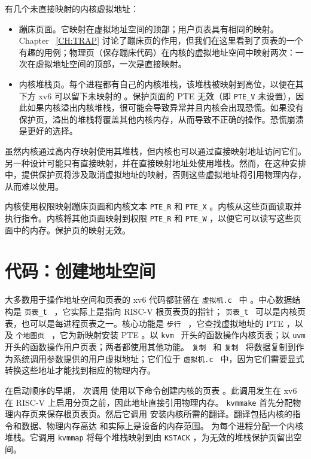 \documentclass[UTF8]{article}
\begin{document}
有几个未直接映射的内核虚拟地址：  

   \begin{itemize}

 
   \item   蹦床页面。它映射在虚拟地址空间的顶部；用户页表具有相同的映射。 Chapter~    \ref{CH:TRAP}    讨论了蹦床页的作用，但我们在这里看到了页表的一个有趣的用例；物理页（保存蹦床代码）在内核的虚拟地址空间中映射两次：一次在虚拟地址空间的顶部，一次是直接映射。   \item   内核堆栈页。每个进程都有自己的内核堆栈，该堆栈被映射到高位，以便在其下方 xv6 可以留下未映射的        。保护页面的 PTE 无效（即
    \lstinline{PTE_V}    未设置），因此如果内核溢出内核堆栈，很可能会导致异常并且内核会出现恐慌。如果没有保护页，溢出的堆栈将覆盖其他内核内存，从而导致不正确的操作。恐慌崩溃是更好的选择。  \end{itemize}     

虽然内核通过高内存映射使用其堆栈，但内核也可以通过直接映射地址访问它们。另一种设计可能只有直接映射，并在直接映射地址处使用堆栈。然而，在这种安排中，提供保护页将涉及取消虚拟地址的映射，否则这些虚拟地址将引用物理内存，从而难以使用。  

内核使用权限映射蹦床页面和内核文本
    \lstinline{PTE_R}    和
    \lstinline{PTE_X}    。内核从这些页面读取并执行指令。内核将其他页面映射到权限
    \lstinline{PTE_R}    和
    \lstinline{PTE_W}    ，以便它可以读写这些页面中的内存。保护页的映射无效。
    \section{代码：创建地址空间  }     

大多数用于操作地址空间和页表的 xv6 代码都驻留在  {    \tt    虚拟机.c   }  中
        。中心数据结构是  {    \tt    页表\_t   }  ，它实际上是指向 RISC-V 根页表页的指针； {    \tt    页表\_t   }  可以是内核页表，也可以是每进程页表之一。核心功能是  {    \tt    步行   }  ，它查找虚拟地址的 PTE ，以及  {    \tt    个地图页   }  ，它为新映射安装 PTE 。以  {    \tt    kvm   }  开头的函数操作内核页表；以  {    \tt    uvm   }  开头的函数操作用户页表；两者都使用其他功能。
  {    \tt    复制   }  和  {    \tt    复制   }  将数据复制到作为系统调用参数提供的用户虚拟地址；它们位于  {    \tt    虚拟机.c   }  中，因为它们需要显式转换这些地址才能找到相应的物理内存。  

在启动顺序的早期，
        次调用
        使用以下命令创建内核的页表
        。此调用发生在 xv6 在 RISC-V 上启用分页之前，因此地址直接引用物理内存。
    \lstinline{kvmmake}    首先分配物理内存页来保存根页表页。然后它调用
        安装内核所需的翻译。翻译包括内核的指令和数据、物理内存高达
        和实际上是设备的内存范围。
        为每个进程分配一个内核堆栈。它调用    \lstinline{kvmmap}    将每个堆栈映射到由
    \lstinline{KSTACK}    ，为无效的堆栈保护页留出空间。  
\end{document}
